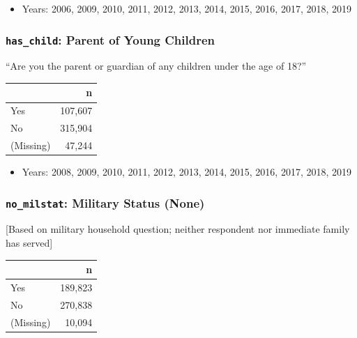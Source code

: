 \documentclass[10pt,article,oneside]{memoir}
\theoremstyle{definition}
\begin{document}
\begin{itemize}
\tightlist
\item
  Years: 2006, 2009, 2010, 2011, 2012, 2013, 2014, 2015, 2016, 2017,
  2018, 2019
\end{itemize}

\hypertarget{has_child-parent-of-young-children}{%
\subsubsection{\texorpdfstring{\texttt{has\_child}: Parent of Young
Children}{has\_child: Parent of Young Children}}\label{has_child-parent-of-young-children}}

``Are you the parent or guardian of any children under the age of 18?''

\begin{table}[H]
\centering
\begin{tabular}{lr}
\toprule
 & n\\
\midrule
Yes & 107,607\\
No & 315,904\\
(Missing) & 47,244\\
\bottomrule
\end{tabular}
\end{table}

\begin{itemize}
\tightlist
\item
  Years: 2008, 2009, 2010, 2011, 2012, 2013, 2014, 2015, 2016, 2017,
  2018, 2019
\end{itemize}

\hypertarget{no_milstat-military-status-none}{%
\subsubsection{\texorpdfstring{\texttt{no\_milstat}: Military Status
(None)}{no\_milstat: Military Status (None)}}\label{no_milstat-military-status-none}}

{[}Based on military household question; neither respondent nor
immediate family has served{]}

\begin{table}[H]
\centering
\begin{tabular}{lr}
\toprule
 & n\\
\midrule
Yes & 189,823\\
No & 270,838\\
(Missing) & 10,094\\
\bottomrule
\end{tabular}
\end{table}
\end{document}

